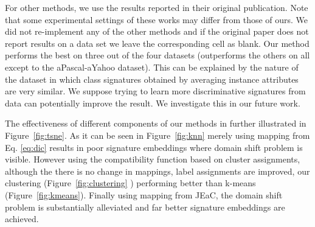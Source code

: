\documentclass[10pt,twocolumn,letterpaper]{article}
\begin{document}
 For other methods, we use the results reported in their original publication. Note that some experimental settings of these works may differ from those of ours. We did not re-implement any of the other methods and if the original paper does not report results on a data set we leave the corresponding cell as blank.
Our method performs the best on three out of the four datasets (outperforms the others on all except to the aPascal-aYahoo dataset). This can be explained by the nature of the dataset in which class signatures obtained by averaging instance attributes are very similar. We suppose trying to learn
more discriminative signatures from data can potentially improve the result. We investigate this in our future work.

The effectiveness of different components of our methods in further illustrated in Figure~\ref{fig:tsne}. As it can be seen in
Figure~\ref{fig:knn} merely using mapping from Eq. \eqref{eq:dic} results in poor signature embeddings where domain shift problem is
visible. However using the compatibility function based on cluster assignments, although the there is no change in mappings,
label assignments are improved, our clustering  (Figure~\ref{fig:clustering} ) performing  better than k-means (Figure~\ref{fig:kmeans}). Finally using
mapping from JEaC, the domain shift problem is substantially alleviated and far better signature embeddings are achieved.
\end{document}
